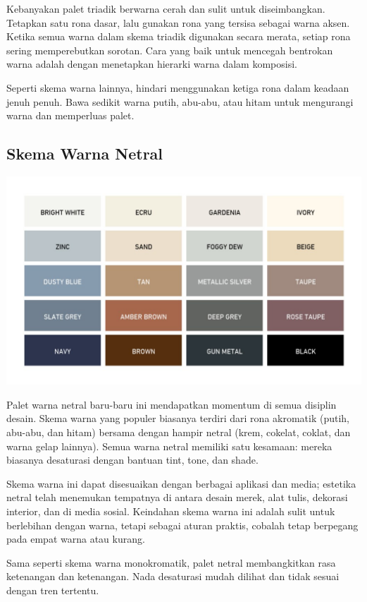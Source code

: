 \documentclass[a4paper]{article}
\begin{document}
Kebanyakan palet triadik berwarna cerah dan sulit untuk diseimbangkan. Tetapkan satu rona dasar, lalu gunakan rona yang tersisa sebagai warna aksen. Ketika semua warna dalam skema triadik digunakan secara merata, setiap rona sering memperebutkan sorotan. Cara yang baik untuk mencegah bentrokan warna adalah dengan menetapkan hierarki warna dalam komposisi.

Seperti skema warna lainnya, hindari menggunakan ketiga rona dalam keadaan jenuh penuh. Bawa sedikit warna putih, abu-abu, atau hitam untuk mengurangi warna dan memperluas palet.

\subsection{Skema Warna Netral}
\begin{center}
  \includegraphics[width=\widthtext]{resources/netral.jpg}
\end{center}
Palet warna netral baru-baru ini mendapatkan momentum di semua disiplin desain. Skema warna yang populer biasanya terdiri dari rona akromatik (putih, abu-abu, dan hitam) bersama dengan hampir netral (krem, cokelat, coklat, dan warna gelap lainnya). Semua warna netral memiliki satu kesamaan: mereka biasanya desaturasi dengan bantuan tint, tone, dan shade.

Skema warna ini dapat disesuaikan dengan berbagai aplikasi dan media; estetika netral telah menemukan tempatnya di antara desain merek, alat tulis, dekorasi interior, dan di media sosial. Keindahan skema warna ini adalah sulit untuk berlebihan dengan warna, tetapi sebagai aturan praktis, cobalah tetap berpegang pada empat warna atau kurang.

Sama seperti skema warna monokromatik, palet netral membangkitkan rasa ketenangan dan ketenangan. Nada desaturasi mudah dilihat dan tidak sesuai dengan tren tertentu.
\end{document}
